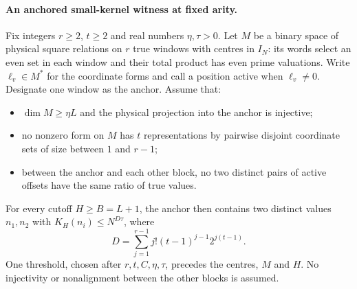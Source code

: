 \paragraph{An anchored small-kernel witness at fixed arity.}
\label{p18:conf:anchored}
Fix integers $r\ge2$, $t\ge2$ and real numbers $\eta,\tau>0$.
Let $M$ be a binary space of physical square relations on $r$ true
windows with centres in $I_N$: its words select an even set in each
window and their total product has even prime valuations.
Write $\ell_v\in M^*$ for the coordinate forms and call a position
active when $\ell_v\ne0$. Designate one window as the anchor.
Assume that:
\begin{itemize}
\item $\dim M\ge\eta L$ and the physical projection into the anchor
is injective;
\item no nonzero form on $M$ has $t$ representations by pairwise
disjoint coordinate sets of size between $1$ and $r-1$;
\item between the anchor and each other block, no two distinct pairs
of active offsets have the same ratio of true values.
\end{itemize}
For every cutoff $H\ge B=L+1$, the anchor then contains two distinct
values $n_1,n_2$ with $K_H(n_i)\le N^{D\tau}$, where
\[
 D=\sum_{j=1}^{r-1}j!(t-1)^{j-1}2^{j(t-1)}.
\]
One threshold, chosen after $r,t,C,\eta,\tau$, precedes the centres,
$M$ and $H$. No injectivity or nonalignment between the other
blocks is assumed.

